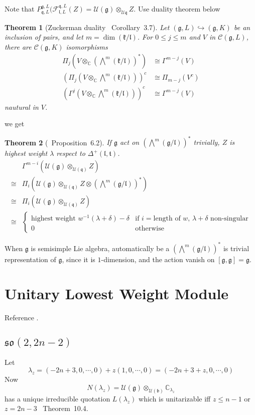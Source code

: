 \documentclass[12pt]{article}
\newtheorem{thm}{Theorem}
\def\bC{{\mathbb{C}}}
\def\aso{\mathfrak{so}}
\def\fbb{\mathfrak{b}}
\def\fll{\mathfrak{l}}
\def\fqq{\mathfrak{q}}
\def\ftt{\mathfrak{t}}
\def\fgg{\mathfrak{g}}
\def\fkk{\mathfrak{k}}
\def\ccc{\mathcal{C}}
\def\cuu{\mathcal{U}}
\def\cff{\mathcal{F}}
\begin{document}
Note that $P_{\fqq,L}^{\fgg,L}(\cff_{\fll,L}^{\fqq,L}(Z) 
= \cuu(\fgg)\otimes_{\cuu{\fqq}}Z$.
Use duality theorem below
\begin{thm}[Zuckerman duality \cite{KnappVogan1995}~Corollary~3.7]
Let $(\fgg,L)\hookrightarrow (\fgg,K)$ be an inclusion of pairs, 
and let $m=\dim(\fkk/\fll)$. For $0\leq j\leq m$ and $V$ in 
$\ccc(\fgg,L)$, there are $\ccc(\fgg,K)$ isomorphisms
\begin{align*}
\Pi_j(V\otimes_\bC (\bigwedge^m(\fkk/\fll))^*)&\cong \Gamma^{m-j}(V)\\
(\Pi_j(V\otimes_\bC \bigwedge^m(\fkk/\fll)))^c &\cong \Pi_{m-j}(V^c)\\
(\Gamma^j(V\otimes_\bC\bigwedge^m(\fkk/\fll)))^c& \cong \Gamma^{m-j}(V)
\end{align*} 
nautural in $V$.
\end{thm}
 
we get
\begin{thm}[\cite{Enright1985}~Proposition~6.2]
If $\fgg$ act on $(\bigwedge^m(\fgg/\fll))^*$ trivially,
$Z$ is highest weight $\lambda$ respect to $\Delta^+(\fll,\ftt)$. 
\[
\begin{split}
 &\Gamma^{m-i}(\cuu(\fgg)\otimes_{\cuu(\fqq)}Z)\\
\cong& \Pi_i(\cuu(\fgg)\otimes_{\cuu(\fqq)}Z \otimes (\bigwedge^m(\fgg/\fll))^*)\\
\cong& \Pi_i(\cuu(\fgg)\otimes_{\cuu(\fqq)}Z)\\
\cong& \begin{cases}
\text{highest weight } w^{-1}(\lambda+\delta)-\delta & \text{if } i=\text{length of $w$, $\lambda+\delta$ non-singular}\\
0 & \text{otherwise}  
\end{cases}
\end{split}
\]
\end{thm}
When $\fgg$ is semisimple Lie algebra, automatically be a $(\bigwedge^m(\fgg/\fll))^*$ is trivial representation of $\fgg$,
since it is $1$-dimension, and the action vanish on $[\fgg,\fgg]=\fgg$.

\section{Unitary Lowest Weight Module}
Reference \cite{Enright1983}.
\subsection{$\aso(2,2n-2)$}
Let 
\[
\lambda_z = (-2n+3, 0,\cdots, 0) + z(1, 0, \cdots, 0)
= (-2n+3+z,0, \cdots, 0)
\]
Now
\[
N(\lambda_z)=\cuu(\fgg)\otimes_{\cuu(\fbb)}\bC_{\lambda_z}
\]
has a unique irreducible quotation $L(\lambda_z)$ which is unitarizable iff $z\leq n-1$ or $z=2n-3$ 
\cite{Enright1983}~Theorem~10.4. 
\end{document}
